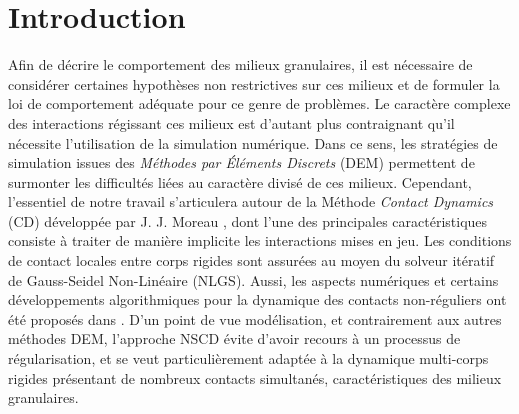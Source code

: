 \vspace{1cm}

\minitoc

\newpage

\section*{Introduction}

Afin de décrire le comportement des milieux granulaires, il est nécessaire de considérer certaines hypothèses non restrictives sur ces milieux et de formuler la loi de comportement adéquate pour ce genre de problèmes. Le caractère complexe des interactions régissant ces milieux est d'autant plus contraignant qu'il nécessite l'utilisation de la simulation numérique. Dans ce sens, les stratégies de simulation issues des \textit{Méthodes par Éléments Discrets} (DEM) permettent de surmonter les difficultés liées au caractère divisé de ces milieux. Cependant, l'essentiel de notre travail s'articulera autour de la Méthode \textit{Contact Dynamics} (CD) développée par J. J. Moreau \cite{jean1992unilaterality, moreau1977application, moreau1988unilateral, moreau1994numerical, moreau1999sweeping}, dont l'une des principales caractéristiques consiste à traiter de manière implicite les interactions mises en jeu. Les conditions de contact locales entre corps rigides sont assurées au moyen du solveur itératif de Gauss-Seidel Non-Linéaire (NLGS). Aussi, les aspects numériques et certains développements algorithmiques pour la dynamique des contacts non-réguliers ont été proposés dans \cite{acary2008numerical}. D'un point de vue modélisation, et contrairement aux autres méthodes DEM, l'approche NSCD évite d'avoir recours à un processus de régularisation, et se veut particulièrement adaptée à la dynamique multi-corps rigides présentant de nombreux contacts simultanés, caractéristiques des milieux granulaires.\\

